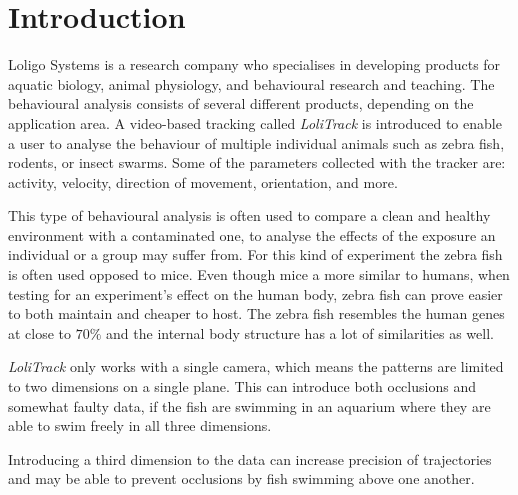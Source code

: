 \chapter{Introduction}\label{ch:intro}
Loligo Systems is a research company who specialises in developing products for aquatic biology, animal physiology, and behavioural research and teaching. The behavioural analysis consists of several different products, depending on the application area. A video-based tracking called \textit{LoliTrack} is introduced to enable a user to analyse the behaviour of multiple individual animals such as zebra fish, rodents, or insect swarms. Some of the parameters collected with the tracker are: activity, velocity, direction of movement, orientation, and more.

This type of behavioural analysis is often used to compare a clean and healthy environment with a contaminated one, to analyse the effects of the exposure an individual or a group may suffer from. For this kind of experiment the zebra fish is often used opposed to mice. Even though mice a more similar to humans, when testing for an experiment's effect on the human body, zebra fish can prove easier to both maintain and cheaper to host. The zebra fish resembles the human genes at close to $ 70\% $ and the internal body structure has a lot of similarities as well.

\textit{LoliTrack} only works with a single camera, which means the patterns are limited to two dimensions on a single plane. This can introduce both occlusions and somewhat faulty data, if the fish are swimming in an aquarium where they are able to swim freely in all three dimensions.

Introducing a third dimension to the data can increase precision of trajectories and may be able to prevent occlusions by fish swimming above one another.
